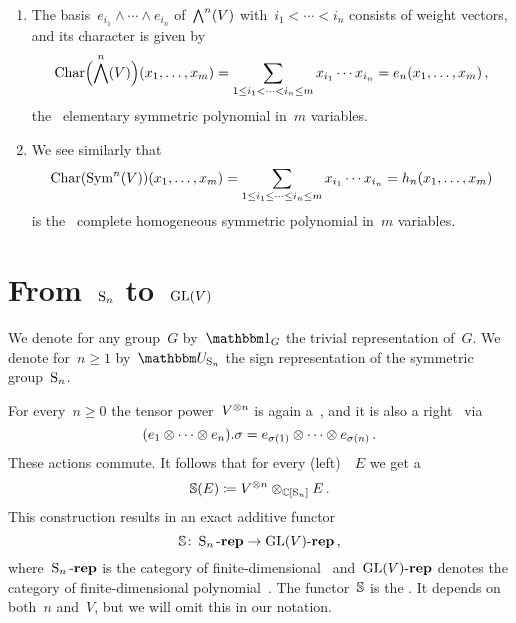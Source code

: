 \documentclass[a4paper,10pt]{scrartcl}
\begin{document}
\begin{example}
  \leavevmode
  \begin{enumerate}
    \item
      The basis~$e_{i_1} \wedge \dotsb \wedge e_{i_n}$ of~$\bigwedge^n(V)$ with~$i_1 < \dotsb < i_n$ consists of weight vectors, and its character is given by
      \[
        \operatorname{Char}\Bigl( \bigwedge^n(V) \Bigr)(x_1, \dotsc, x_m)
        =
        \sum_{1 \leq i_1 < \dotsb < i_n \leq m} x_{i_1} \dotsb x_{i_n}
        =
        e_n(x_1, \dotsc, x_m) \,,
      \]
      the~{} elementary symmetric polynomial in~$m$ variables.
    \item
      We see similarly that
      \[
        \operatorname{Char}(\operatorname{Sym}^n(V))(x_1, \dotsc, x_m)
        =
        \sum_{1 \leq i_1 \leq \dotsb \leq i_n \leq m} x_{i_1} \dotsb x_{i_n}
        =
        h_n(x_1, \dotsc, x_m)
      \]
      is the~{} complete homogeneous symmetric polynomial in~$m$ variables.
  \end{enumerate}
\end{example}





\section{From~$\operatorname{S}_n$ to~$\operatorname{GL}(V)$}

We denote for any group~$G$ by~$\trivrep_G$ the trivial representation of~$G$.
We denote for~$n \geq 1$ by~$\signrep_{\symm_n}$ the sign representation of the symmetric group~$\operatorname{S}_n$.

For every~$n \geq 0$ the tensor power~$V^{\otimes n}$ is again a~{}, and it is also a right~{} via
\[
  (e_1 \otimes \dotsb \otimes e_n) . \sigma
  =
  e_{\sigma(1)} \otimes \dotsb \otimes e_{\sigma(n)} \,.
\]
These actions commute.
It follows that for every (left)~{}~$E$ we get a~{}
\[
  \mathbb{S}(E)
  \coloneqq
  V^{\otimes n} \otimes_{\mathbb{C}[\operatorname{S}_n]} E \,.
\]
This construction results in an exact additive functor
\[
  \mathbb{S}
  \colon
  \operatorname{S}_n\text{-}\mathbf{rep}
  \to
  \operatorname{GL}(V)\text{-}\mathbf{rep} \,,
\]
where~$\operatorname{S}_n\text{-}\mathbf{rep}$ is the category of finite-dimensional~{} and~$\operatorname{GL}(V)\text{-}\mathbf{rep}$ denotes the category of finite-dimensional polynomial~{}. 
The functor~$\mathbb{S}$ is the .
It depends on both~$n$ and~$V$, but we will omit this in our notation.
\end{document}
